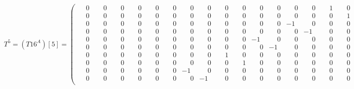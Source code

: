 \documentclass[10pt]{article}
\begin{document}
\[
T^{5} = (T16^A)[5] = \left(\begin{smallmatrix}
\phantom{-}0 & \phantom{-}0 & \phantom{-}0 & \phantom{-}0 & \phantom{-}0 & \phantom{-}0 & \phantom{-}0 & \phantom{-}0 & \phantom{-}0 & \phantom{-}0 & \phantom{-}0 & \phantom{-}0 & \phantom{-}0 & \phantom{-}0 & \phantom{-}1 & \phantom{-}0 \\
\phantom{-}0 & \phantom{-}0 & \phantom{-}0 & \phantom{-}0 & \phantom{-}0 & \phantom{-}0 & \phantom{-}0 & \phantom{-}0 & \phantom{-}0 & \phantom{-}0 & \phantom{-}0 & \phantom{-}0 & \phantom{-}0 & \phantom{-}0 & \phantom{-}0 & \phantom{-}1 \\
\phantom{-}0 & \phantom{-}0 & \phantom{-}0 & \phantom{-}0 & \phantom{-}0 & \phantom{-}0 & \phantom{-}0 & \phantom{-}0 & \phantom{-}0 & \phantom{-}0 & \phantom{-}0 & \phantom{-}0 & -1 & \phantom{-}0 & \phantom{-}0 & \phantom{-}0 \\
\phantom{-}0 & \phantom{-}0 & \phantom{-}0 & \phantom{-}0 & \phantom{-}0 & \phantom{-}0 & \phantom{-}0 & \phantom{-}0 & \phantom{-}0 & \phantom{-}0 & \phantom{-}0 & \phantom{-}0 & \phantom{-}0 & -1 & \phantom{-}0 & \phantom{-}0 \\
\phantom{-}0 & \phantom{-}0 & \phantom{-}0 & \phantom{-}0 & \phantom{-}0 & \phantom{-}0 & \phantom{-}0 & \phantom{-}0 & \phantom{-}0 & \phantom{-}0 & -1 & \phantom{-}0 & \phantom{-}0 & \phantom{-}0 & \phantom{-}0 & \phantom{-}0 \\
\phantom{-}0 & \phantom{-}0 & \phantom{-}0 & \phantom{-}0 & \phantom{-}0 & \phantom{-}0 & \phantom{-}0 & \phantom{-}0 & \phantom{-}0 & \phantom{-}0 & \phantom{-}0 & -1 & \phantom{-}0 & \phantom{-}0 & \phantom{-}0 & \phantom{-}0 \\
\phantom{-}0 & \phantom{-}0 & \phantom{-}0 & \phantom{-}0 & \phantom{-}0 & \phantom{-}0 & \phantom{-}0 & \phantom{-}0 & \phantom{-}1 & \phantom{-}0 & \phantom{-}0 & \phantom{-}0 & \phantom{-}0 & \phantom{-}0 & \phantom{-}0 & \phantom{-}0 \\
\phantom{-}0 & \phantom{-}0 & \phantom{-}0 & \phantom{-}0 & \phantom{-}0 & \phantom{-}0 & \phantom{-}0 & \phantom{-}0 & \phantom{-}0 & \phantom{-}1 & \phantom{-}0 & \phantom{-}0 & \phantom{-}0 & \phantom{-}0 & \phantom{-}0 & \phantom{-}0 \\
\phantom{-}0 & \phantom{-}0 & \phantom{-}0 & \phantom{-}0 & \phantom{-}0 & \phantom{-}0 & -1 & \phantom{-}0 & \phantom{-}0 & \phantom{-}0 & \phantom{-}0 & \phantom{-}0 & \phantom{-}0 & \phantom{-}0 & \phantom{-}0 & \phantom{-}0 \\
\phantom{-}0 & \phantom{-}0 & \phantom{-}0 & \phantom{-}0 & \phantom{-}0 & \phantom{-}0 & \phantom{-}0 & -1 & \phantom{-}0 & \phantom{-}0 & \phantom{-}0 & \phantom{-}0 & \phantom{-}0 & \phantom{-}0 & \phantom{-}0 & \phantom{-}0 \\

\end{smallmatrix}\]
\end{document}
